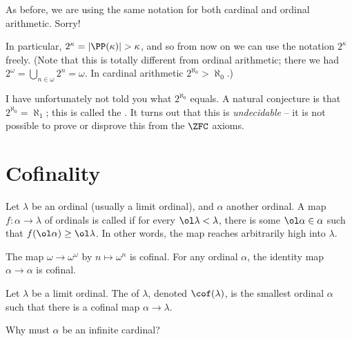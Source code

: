 \begin{abuse}
	As before, we are using the same notation for
	both cardinal and ordinal arithmetic. Sorry!
\end{abuse}

In particular, $2^\kappa = \left\lvert \PP(\kappa) \right\rvert > \kappa$,
and so from now on we can use the notation $2^\kappa$ freely.
(Note that this is totally different from ordinal arithmetic;
there we had $2^\omega = \bigcup_{n\in\omega} 2^n = \omega$.
In cardinal arithmetic $2^{\aleph_0} > \aleph_0$.)

I have unfortunately not told you what $2^{\aleph_0}$ equals.
A natural conjecture is that $2^{\aleph_0} = \aleph_1$; this is called the
.
It turns out that this is \emph{undecidable} -- it is not possible
to prove or disprove this from the $\ZFC$ axioms.

\section{Cofinality}

\begin{definition}
	Let $\lambda$ be an ordinal (usually a limit ordinal),
	and $\alpha$ another ordinal.
	A map $f : \alpha \to \lambda$ of ordinals is called 
	if for every $\ol\lambda < \lambda$, there is some $\ol\alpha \in \alpha$
	such that $f(\ol\alpha) \ge \ol\lambda$.
	In other words, the map reaches arbitrarily high into $\lambda$.
\end{definition}
\begin{example}
	\listhack
	\begin{enumerate}[(a)]
		\ii The map $\omega \to \omega^\omega$ by $n \mapsto \omega^n$ is cofinal.
		\ii For any ordinal $\alpha$, the identity map $\alpha \to \alpha$ is cofinal.
	\end{enumerate}
\end{example}

\begin{definition}
	Let $\lambda$ be a limit ordinal.
	The  of $\lambda$, denoted $\cof(\lambda)$,
	is the smallest ordinal $\alpha$ such that there is a cofinal map
	$\alpha \to \lambda$.
\end{definition}
\begin{ques}
	Why must $\alpha$ be an infinite cardinal?
\end{ques}

